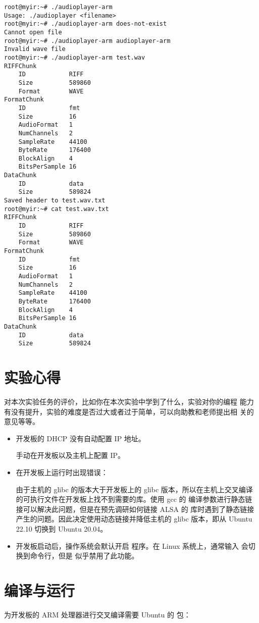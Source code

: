 \begin{verbatim}
root@myir:~# ./audioplayer-arm 
Usage: ./audioplayer <filename>
root@myir:~# ./audioplayer-arm does-not-exist
Cannot open file
root@myir:~# ./audioplayer-arm audioplayer-arm 
Invalid wave file
root@myir:~# ./audioplayer-arm test.wav
RIFFChunk
    ID            RIFF
    Size          589860
    Format        WAVE
FormatChunk
    ID            fmt 
    Size          16
    AudioFormat   1
    NumChannels   2
    SampleRate    44100
    ByteRate      176400
    BlockAlign    4
    BitsPerSample 16
DataChunk
    ID            data
    Size          589824
Saved header to test.wav.txt
root@myir:~# cat test.wav.txt 
RIFFChunk
    ID            RIFF
    Size          589860
    Format        WAVE
FormatChunk
    ID            fmt 
    Size          16
    AudioFormat   1
    NumChannels   2
    SampleRate    44100
    ByteRate      176400
    BlockAlign    4
    BitsPerSample 16
DataChunk
    ID            data
    Size          589824
\end{verbatim}

\section{实验心得}

对本次实验任务的评价，比如你在本次实验中学到了什么，实验对你的编程
能力有没有提升，实验的难度是否过大或者过于简单，可以向助教和老师提出相
关的意见等等。



\begin{itemize}
    \item 开发板的 DHCP 没有自动配置 IP 地址。
    
    手动在开发板以及主机上配置 IP。

    \item 在开发板上运行时出现错误：
    
    
    由于主机的 glibc 的版本大于开发板上的 glibc 版本，所以在主机上交叉编译的可执行文件在开发板上找不到需要的库。使用 gcc 的  编译参数进行静态链接可以解决此问题，但是在预先调研如何链接 ALSA 的  库时遇到了静态链接产生的问题。因此决定使用动态链接并降低主机的 glibc 版本，即从 Ubuntu 22.10 切换到 Ubuntu 20.04。

    \item 开发板启动后，操作系统会默认开启  程序。在 Linux 系统上，通常输入  会切换到命令行，但是  似乎禁用了此功能。
    


\end{itemize}

\section{编译与运行}

为开发板的 ARM 处理器进行交叉编译需要 Ubuntu 的  包：